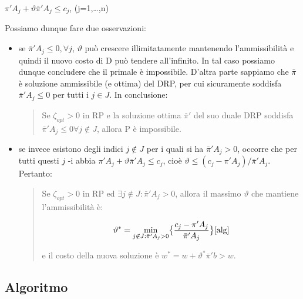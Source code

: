 \documentclass[11pt]{book}
\begin{document}
\begin{center}
$\pi'A_j + \vartheta \bar{\pi}'A_j \leq c_j$, (j=1,\dots,n)
\end{center}

Possiamo dunque fare due osservazioni:

\begin{itemize}

\item se $\bar{\pi}'A_j \leq 0, \forall j$, $\vartheta$ pu\`o crescere
  illimitatamente mantenendo l'ammissibilit\`a e quindi il nuovo costo
  di D pu\`o tendere all'infinito. In tal caso possiamo dunque
  concludere che il primale \`e impossibile. D'altra parte sappiamo
  che $\bar{\pi}$ \`e soluzione ammissibile (e ottima) del DRP, per
  cui sicuramente soddisfa $\bar{\pi}'A_j \leq 0$ per tutti i $j \in
  J$. In conclusione:

  \begin{quote}
    Se $\zeta_{opt} > 0$ in RP e la soluzione ottima $\bar{\pi}'$ del
    suo duale DRP soddisfa $\bar{\pi}'A_j \leq 0 \forall j \not\in J$,
    allora P \`e impossibile.
  \end{quote}

\item se invece esistono degli indici $j \not\in J$ per i quali si ha
  $\bar{\pi}' A_j > 0$, occorre che per tutti questi $j$ -i abbia
  $\pi'A_j + \vartheta\bar{\pi}'A_j \leq c_j$, cio\`e $\vartheta \leq
  (c_j - \pi'A_j)/\bar{\pi}'A_j$. Pertanto:

  \begin{quote}
    Se $\zeta_{opt} > 0$ in RP ed $\exists j \not \in J :
    \bar{\pi}'A_j > 0$, allora il massimo $\vartheta$ che mantiene
    l'ammissibilit\`a \`e:

    \begin{center}
      \begin{equation}
      \vartheta^* = \min\limits_{j\not\in J : \bar{\pi}'A_j > 0}
      \bigr\{ \frac{c_j - \pi'A_j}{\bar{\pi}'A_j} \bigr\}
      \ref{alg}
      \end{equation}
    \end{center}

    e il costo della nuova soluzione \`e $w^* = w +
    \vartheta^*\bar{\pi}'b > w$.
  \end{quote}

\end{itemize}

\subsection{Algoritmo}
\end{document}
